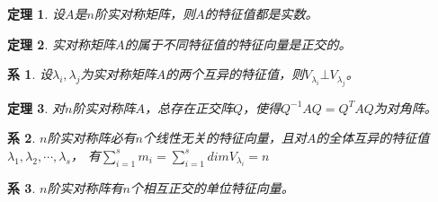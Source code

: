 \documentclass[a4paper]{book}
\newtheorem{cor}{系}[chapter]
\newtheorem{thm}{定理}[chapter]
\begin{document}
\begin{thm}
设$A$是$n$阶实对称矩阵，则$A$的特征值都是实数。
\end{thm}

\begin{thm}
实对称矩阵$A$的属于不同特征值的特征向量是正交的。
\end{thm}

\begin{cor}
设$\lambda_i,\lambda_j$为实对称矩阵$A$的两个互异的特征值，则$V_{\lambda_i}\bot V_{\lambda_j}$。
\end{cor}

\begin{thm}
对$n$阶实对称阵$A$，总存在正交阵$Q$，使得$Q^{-1}AQ=Q^TAQ$为对角阵。
\end{thm}

\begin{cor}
$n$阶实对称阵必有$n$个线性无关的特征向量，且对$A$的全体互异的特征值
$\lambda_1,\lambda_2,\cdots,\lambda_s$，
有$\sum_{i=1}^s m_i=\sum_{i=1}^s dimV_{\lambda_i}=n$
\end{cor}

\begin{cor}
$n$阶实对称阵有$n$个相互正交的单位特征向量。
\end{cor}

\end{document}
